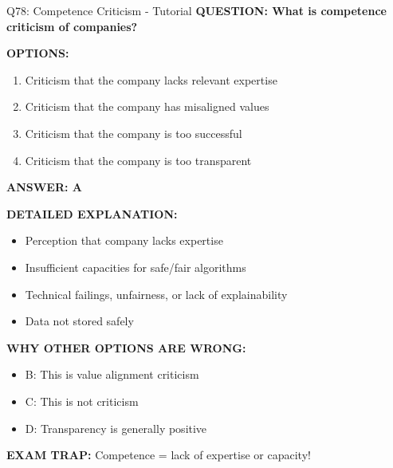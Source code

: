 \documentclass[8pt]{beamer}
\begin{document}
	\begin{frame}{Q78: Competence Criticism - Tutorial}
		\fontsize{6.5}{7.5}\selectfont
		\textbf{QUESTION: What is competence criticism of companies?}
		
		\vspace{0.1cm}
		\textbf{OPTIONS:}
		\begin{enumerate}
			\item Criticism that the company lacks relevant expertise
			\item Criticism that the company has misaligned values
			\item Criticism that the company is too successful
			\item Criticism that the company is too transparent
		\end{enumerate}
		
		\vspace{0.1cm}
		\textcolor{myblue}{\textbf{ANSWER: A}}
		
		\vspace{0.1cm}
		\textbf{DETAILED EXPLANATION:}
		\begin{itemize}
			\item Perception that company lacks expertise
			\item Insufficient capacities for safe/fair algorithms
			\item Technical failings, unfairness, or lack of explainability
			\item Data not stored safely
		\end{itemize}
		
		\vspace{0.1cm}
		\textcolor{myred}{\textbf{WHY OTHER OPTIONS ARE WRONG:}}
		\begin{itemize}
			\item \textcolor{myred}{B:} This is value alignment criticism
			\item \textcolor{myred}{C:} This is not criticism
			\item \textcolor{myred}{D:} Transparency is generally positive
		\end{itemize}
		
		\textcolor{myred}{\textbf{EXAM TRAP:}} Competence = \textcolor{myblue}{lack of expertise or capacity}!
	\end{frame}
	
\end{document}
